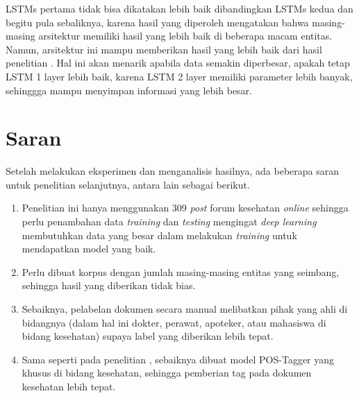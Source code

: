 LSTMs pertama tidak bisa dikatakan lebih baik dibandingkan LSTMs kedua dan begitu pula sebaliknya, karena hasil yang diperoleh mengatakan bahwa masing-masing arsitektur memiliki hasil yang lebih baik di beberapa macam entitas. Namun, arsitektur ini mampu memberikan hasil yang lebih baik dari hasil penelitian \cite{skripsiKakRadit}. Hal ini akan menarik apabila data semakin diperbesar, apakah tetap LSTM 1 layer lebih baik, karena LSTM 2 layer memiliki parameter lebih banyak, sehinggga mampu menyimpan informasi yang lebih besar.

\section{Saran}
Setelah melakukan eksperimen dan menganalisis hasilnya, ada beberapa saran untuk penelitian selanjutnya, antara lain sebagai berikut.

\begin{enumerate}
  \item Penelitian ini hanya menggunakan 309 \textit{post} forum kesehatan \textit{online} sehingga perlu penambahan data \textit{training} dan \textit{testing} mengingat \textit{deep learning} membutuhkan data yang besar dalam melakukan \textit{training} untuk mendapatkan model yang baik.

  \item Perlu dibuat korpus dengan jumlah masing-masing entitas yang seimbang, sehingga hasil yang diberikan tidak bias.
  
  \item Sebaiknya, pelabelan dokumen secara manual melibatkan pihak yang ahli di bidangnya (dalam hal ini dokter, perawat, apoteker, atau mahasiswa di bidang kesehatan) supaya label yang diberikan lebih tepat.
  
  \item Sama seperti pada penelitian \cite{skripsiKakRadit}, sebaiknya dibuat model POS-Tagger yang khusus di bidang kesehatan, sehingga pemberian tag pada dokumen kesehatan lebih tepat.

\end{enumerate}